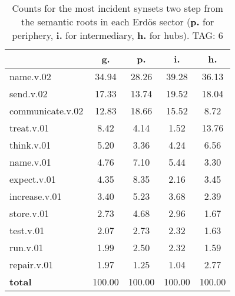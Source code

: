 \begin{table}[h!]
\begin{center}
\begin{tabular}{| l | c | c | c | c |}\hline
 & g. & p. & i. & h. \\\hline
name.v.02 & 34.94  & 28.26  & 39.28  & 36.13 \\\hline
send.v.02 & 17.33  & 13.74  & 19.52  & 18.04 \\\hline
communicate.v.02 & 12.83  & 18.66  & 15.52  & 8.72 \\\hline
treat.v.01 & 8.42  & 4.14  & 1.52  & 13.76 \\\hline
think.v.01 & 5.20  & 3.36  & 4.24  & 6.56 \\\hline
name.v.01 & 4.76  & 7.10  & 5.44  & 3.30 \\\hline
expect.v.01 & 4.35  & 8.35  & 2.16  & 3.45 \\\hline
increase.v.01 & 3.40  & 5.23  & 3.68  & 2.39 \\\hline
store.v.01 & 2.73  & 4.68  & 2.96  & 1.67 \\\hline
test.v.01 & 2.07  & 2.73  & 2.32  & 1.63 \\\hline
run.v.01 & 1.99  & 2.50  & 2.32  & 1.59 \\\hline
repair.v.01 & 1.97  & 1.25  & 1.04  & 2.77 \\\hline
{{\bf total}} & 100.00  & 100.00  & 100.00  & 100.00 \\\hline
\end{tabular}
\caption{Counts for the most incident synsets two step from the semantic roots in each Erd\"os sector ({\bf p.} for periphery, {\bf i.} for intermediary, {\bf h.} for hubs). TAG: 6}
\end{center}
\end{table}